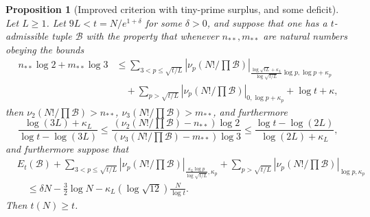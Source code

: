 \documentclass[12pt,a4paper,reqno]{amsart}
\numberwithin{equation}{section}
\theoremstyle{plain}
\newtheorem{proposition}[theorem]{Proposition}
\theoremstyle{definition}
\newcommand\tuple{{\mathcal B}}
\begin{document}
\begin{proposition}[Improved criterion with tiny-prime surplus, and some deficit]\label{balance-23''}  Let $L \geq 1$.  Let $9L < t = N/e^{1+\delta}$ for some $\delta>0$, and suppose that one has a $t$-admissible tuple $\tuple$ with the property that whenever $n_{**}, m_{**}$ are natural numbers obeying the bounds
\begin{align*}
 n_{**} \log 2 + m_{**} \log 3 &\leq 
  \sum_{3 < p \leq \sqrt{t/L}}
  |\nu_p(N!/\prod \tuple)|_{\frac{\log \sqrt{tL} + \kappa_L}{\log\sqrt{t/L}} \log p,\log p+\kappa_p}\\
&\quad   + 
  \sum_{p > \sqrt{t/L}} |\nu_p(N!/\prod \tuple)|_{0,\log p + \kappa_p}   
  + \log t + \kappa,
\end{align*}
  then $\nu_2(N!/\prod \tuple) > n_{**}$, $\nu_3(N!/\prod \tuple) > m_{**}$, and furthermore
$$
\frac{\log(3L)+\kappa_L}{\log t - \log(3L)} \leq \frac{(\nu_2(N!/\prod \tuple)-n_{**}) \log 2}{(\nu_3(N!/\prod \tuple)-m_{**}) \log 3} \leq \frac{\log t - \log(2L)}{\log(2L)+\kappa_L},
$$
and furthermore suppose that
  \begin{equation}\label{new-balance-5}
    \begin{split}
&      E_t(\tuple) + \sum_{3 < p \leq \sqrt{t/L}}
   |\nu_p(N!/\prod \tuple)|_{\frac{\kappa_L \log p}{\log \sqrt{t/L}},\kappa_p} + 
   \sum_{p>\sqrt{t/L}} |\nu_p(N!/\prod \tuple)|_{\log p,\kappa_p}\\
&\quad    \leq \delta N - \frac{3}{2} \log N - \kappa_L (\log \sqrt{12}) \frac{N}{\log t}.
    \end{split}
  \end{equation}
  Then $t(N) \geq t$.
\end{proposition}
\end{document}

